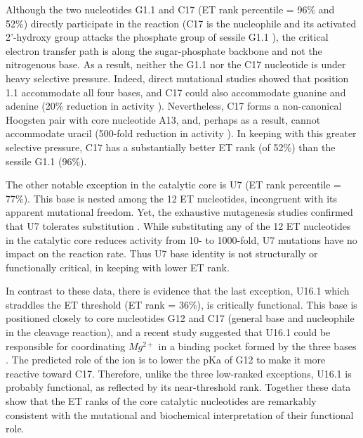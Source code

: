 \documentclass[12pt,a4paper]{report}
\begin{document}
Although the two nucleotides G1.1 and C17 (ET rank percentile = 96\% and 52\%) directly participate in the reaction (C17 is the nucleophile and its activated 2’-hydroxy group attacks the phosphate group of sessile G1.1 \cite{Chi2008}), the critical electron transfer path is along the sugar-phosphate backbone and not the nitrogenous base. As a result, neither the G1.1 nor the C17 nucleotide is under heavy selective pressure. Indeed, direct mutational studies showed that position 1.1 accommodate all four bases, and C17 could also accommodate guanine and adenine (20\% reduction in activity \cite{Nelson2008}). Nevertheless, C17 forms a non-canonical Hoogsten pair with core nucleotide A13, and, perhaps as a result, cannot accommodate uracil (500-fold reduction in activity \cite{Nelson2008}). In keeping with this greater selective pressure, C17 has a substantially better ET rank (of 52\%) than the sessile G1.1 (96\%).

The other notable exception in the catalytic core is U7 (ET rank percentile = 77\%). This base is nested among the 12 ET nucleotides, incongruent with its apparent mutational freedom. Yet, the exhaustive mutagenesis studies confirmed that U7 tolerates substitution \cite{Nelson2008}. While substituting any of the 12 ET nucleotides in the catalytic core reduces activity from 10- to 1000-fold, U7 mutations have no impact on the reaction rate. Thus U7 base identity is not structurally or functionally critical, in keeping with lower ET rank.


In contrast to these data, there is evidence that the last exception, U16.1 which straddles the ET threshold (ET rank = 36\%), is critically functional. This base is positioned closely to core nucleotides G12 and C17 (general base and nucleophile in the cleavage reaction), and a recent study suggested that U16.1 could be responsible for coordinating $Mg^{2+}$ in a binding pocket formed by the three bases \cite{Mir2015}. The predicted role of the ion is to lower the pKa of G12 to make it more reactive toward C17. Therefore, unlike the three low-ranked exceptions, U16.1 is probably functional, as reflected by its near-threshold rank. Together these data show that the ET ranks of the core catalytic nucleotides are remarkably consistent with the mutational and biochemical interpretation of their functional role.
\end{document}
